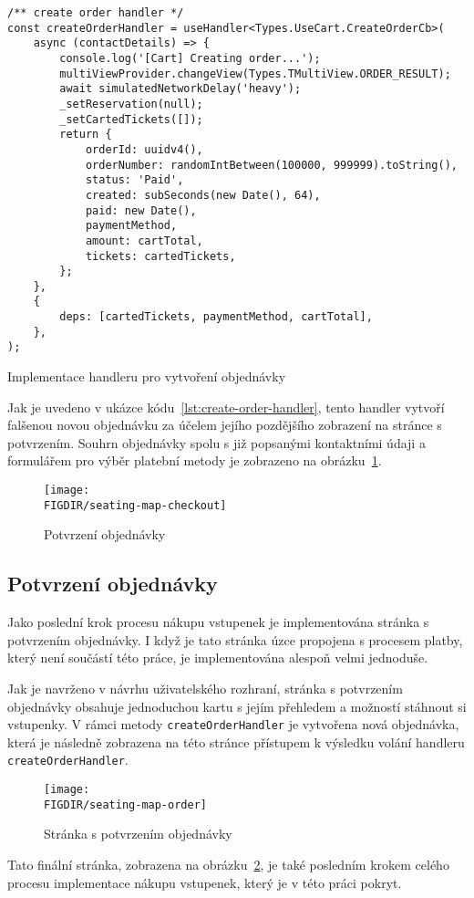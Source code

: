 \begin{listing}[H]
\begin{verbatim}
/** create order handler */
const createOrderHandler = useHandler<Types.UseCart.CreateOrderCb>(
	async (contactDetails) => {
		console.log('[Cart] Creating order...');
		multiViewProvider.changeView(Types.TMultiView.ORDER_RESULT);
		await simulatedNetworkDelay('heavy');
		_setReservation(null);
		_setCartedTickets([]);
		return {
			orderId: uuidv4(),
			orderNumber: randomIntBetween(100000, 999999).toString(),
			status: 'Paid',
			created: subSeconds(new Date(), 64),
			paid: new Date(),
			paymentMethod,
			amount: cartTotal,
			tickets: cartedTickets,
		};
	},
	{
		deps: [cartedTickets, paymentMethod, cartTotal],
	},
);
\end{verbatim}
\caption{Implementace handleru pro vytvoření objednávky}
\label{lst:create-order-handler}
\end{listing}

Jak je uvedeno v ukázce kódu~\ref{lst:create-order-handler}, tento handler vytvoří falšenou novou objednávku za účelem jejího pozdějšího zobrazení na stránce s potvrzením.
Souhrn objednávky spolu s již popsanými kontaktními údaji a formulářem pro výběr platební metody je zobrazeno na obrázku~\ref{fig:seating-map-checkout}.

\begin{figure}[H]
	\centering
	\texttt{[image: \\FIGDIR/seating-map-checkout]}
	\caption{Potvrzení objednávky}
	\label{fig:seating-map-checkout}
\end{figure}

\subsection{Potvrzení objednávky}
\label{subsec:implementace-checkout-order-confirmation}
Jako poslední krok procesu nákupu vstupenek je implementována stránka s potvrzením objednávky.
I když je tato stránka úzce propojena s procesem platby, který není součástí této práce, je implementována alespoň velmi jednoduše.

Jak je navrženo v návrhu uživatelského rozhraní, stránka s potvrzením objednávky obsahuje jednoduchou kartu s jejím přehledem a možností stáhnout si vstupenky.
V rámci metody \texttt{createOrderHandler} je vytvořena nová objednávka, která je následně zobrazena na této stránce přístupem k výsledku volání handleru \texttt{createOrderHandler}.

\begin{figure}[H]
	\centering
	\texttt{[image: \\FIGDIR/seating-map-order]}
	\caption{Stránka s potvrzením objednávky}
	\label{fig:seating-map-order}
\end{figure}

Tato finální stránka, zobrazena na obrázku~\ref{fig:seating-map-order}, je také posledním krokem celého procesu implementace nákupu vstupenek, který je v této práci pokryt.
